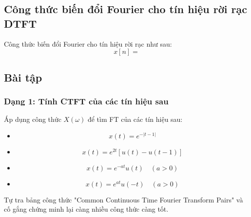 \documentclass{article}
\begin{document}
\subsection{Công thức biến đổi Fourier cho tín hiệu rời rạc DTFT}
Công thức biến đổi Fourier cho tín hiệu rời rạc như sau:
$$x[n]= $$
\subsection{Bài tập}
\subsubsection{Dạng 1: Tính CTFT của các tín hiệu sau}
Áp dụng công thức $X(\omega)$ để tìm FT của các tín hiệu sau:
\begin{itemize}
    \item $$x(t)=e^{-|t-1|}$$
    \item $$x(t)=e^{2t}[u(t)-u(t-1)]$$
    \item $$x(t)=e^{-at}u(t) \quad(a>0)$$
    \item $$x(t)=e^{at}u(-t) \quad(a>0)$$
\end{itemize}
Tự tra bảng công thức "Common Continuous Time Fourier Transform Pairs" và cố gắng chứng minh lại càng nhiều công thức càng tốt.
\end{document}
